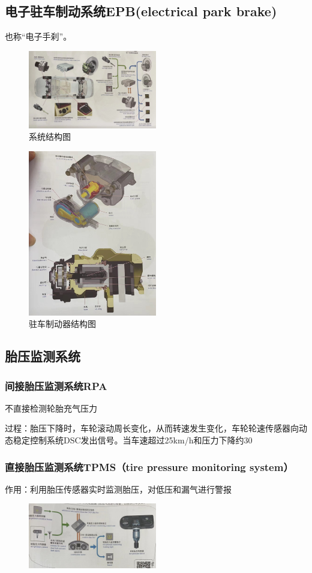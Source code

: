 \subsection{电子驻车制动系统EPB(electrical park brake)}
	也称“电子手刹”。
	\begin{figure}[htbp]
		\centering
		\caption*{系统结构图}
		\includegraphics[width=0.5\textwidth]{5-10}
	\end{figure}
	\begin{figure}[htbp]
		\centering
		\caption*{驻车制动器结构图}
		\includegraphics[width=0.5\textwidth]{5-11}
	\end{figure}
\subsection{胎压监测系统}
	\subsubsection{间接胎压监测系统RPA}
		不直接检测轮胎充气压力
		
		过程：胎压下降时，车轮滚动周长变化，从而转速发生变化，车轮轮速传感器向动态稳定控制系统DSC发出信号。当车速超过25km/h和压力下降约30%
	\subsubsection{直接胎压监测系统TPMS（tire pressure monitoring system）}
		作用：利用胎压传感器实时监测胎压，对低压和漏气进行警报
		\begin{figure}[htbp]
			\centering
			\includegraphics[width=0.5\textwidth]{5-12}
		\end{figure}
